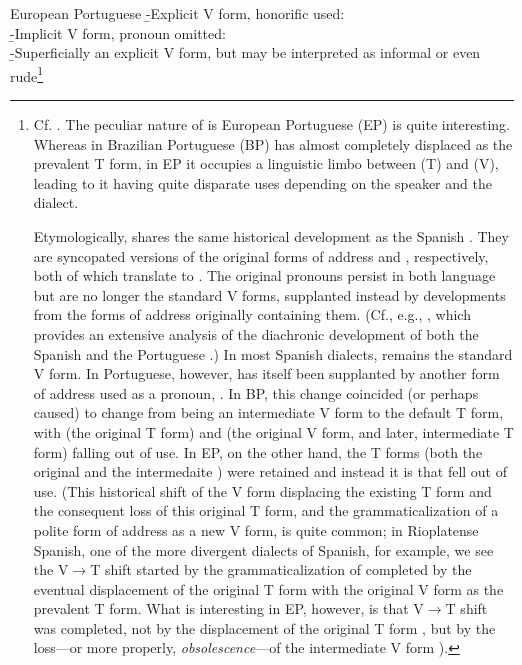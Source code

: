 \pex
	\a European Portuguese
		\beginsubsub
			\b{-}{Explicit V form, honorific used:\\
				 }
			\b{-}{Implicit V form, pronoun omitted:\\
				 }
			\b{-}{Superficially an explicit V form, but may be interpreted as informal or even rude\footnote{
				Cf. \textcite{laraport}. The peculiar nature of  is European Portuguese (EP) is quite interesting. Whereas in Brazilian Portuguese (BP)  has almost completely displaced  as the prevalent T form, in EP it occupies a linguistic limbo between  (T) and  (V), leading to it having quite disparate uses depending on the speaker and the dialect.

				Etymologically,  shares the same historical development as the Spanish . They are syncopated versions of the original forms of address  and , respectively, both of which translate to . The original pronouns  persist in both language but are no longer the standard V forms, supplanted instead by developments from the forms of address originally containing them. (Cf., e.g., \cite{hummelport}, which provides an extensive analysis of the diachronic development of both the Spanish  and the Portuguese .)
				\clearpage
				In most Spanish dialects,  remains the standard V form. In Portuguese, however,  has itself been supplanted by another form of address used as a pronoun, . In BP, this change coincided (or perhaps caused)  to change from being an intermediate V form to the default T form, with  (the original T form) and  (the original V form, and later, intermediate T form) falling out of use. In EP, on the other hand, the T forms (both the original  and the intermedaite ) were retained and instead it is  that fell out of use. (This historical shift of the V form displacing the existing T form and the consequent loss of this original T form, and the grammaticalization of a polite form of address as a new V form, is quite common; in Rioplatense Spanish, one of the more divergent dialects of Spanish, for example, we see the V$\rightarrow$T shift started by the grammaticalization of  completed by the eventual displacement of the original T form  with the original V form  as the prevalent T form. What is interesting in EP, however, is that V$\rightarrow$T shift was completed, not by the displacement of the original T form , but by the loss---or more properly, \emph{obsolescence}---of the intermediate V form ).

}}
